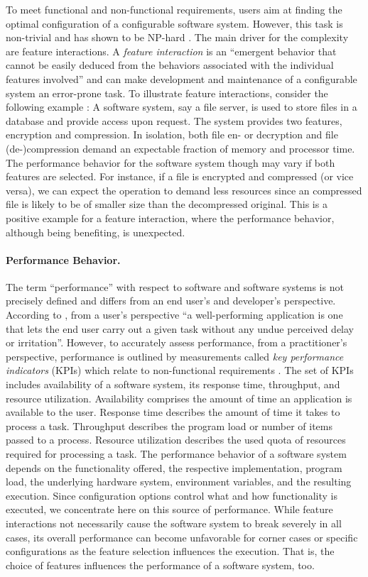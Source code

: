 To meet functional and non-functional requirements, users aim at finding the
optimal configuration of a configurable software system. However, this task is
non-trivial and has shown to be NP-hard \citep{white_selecting_2009}. The main
driver for the complexity are feature interactions. A \emph{feature
interaction} is an ``emergent behavior that cannot be easily deduced from the
behaviors associated with the individual features involved''
\citep{apel_feature-oriented_2013} and can make development and maintenance of
a configurable system an error-prone task.
To illustrate feature interactions, consider the following example
\citep{siegmund_performance-influence_2015}: A software system, say a file
server, is used to store files in a database and provide access upon request.
The system provides two features, encryption and compression. In
isolation, both file en- or decryption and file (de-)compression demand an
expectable fraction of memory and processor time. The performance behavior for
the software system though may vary if both features are selected. For
instance, if a file is encrypted and compressed (or vice versa), we can expect
the operation to demand less resources since an compressed file is likely to be
of smaller size than the decompressed original.
This is a positive example for a feature interaction, where the performance
behavior, although being benefiting, is unexpected.

\paragraph{Performance Behavior.}
The term ``performance'' with respect to software and software systems is not
precisely defined and differs from an end user's and developer’s perspective.
According to \cite{molyneaux_art_2014}, from a user’s perspective ``a well-performing
application is one that lets the end user carry out a given task without any
undue perceived delay or irritation''. However, to accurately assess
performance, from a practitioner’s perspective, performance is outlined by
measurements called \emph{key performance indicators} (KPIs) which relate to
non-functional requirements \citep{molyneaux_art_2014}. The set of KPIs includes
availability of a software system, its response time, throughput, and resource
utilization. Availability comprises the amount of time an application is
available to the user. Response time describes the amount of time it takes to
process a task. Throughput describes the program load or number of items passed
to a process. Resource utilization describes the used quota of resources
required for processing a task.
The performance behavior of a software system depends on the functionality
offered, the respective implementation, program load, the underlying hardware system,
environment variables, and the resulting execution. Since configuration options
control what and how functionality is executed, we concentrate here on this
source of performance. While feature interactions not necessarily cause the
software system to break severely in all cases, its overall performance can
become unfavorable for corner cases or specific configurations as the feature
selection influences the execution. 
That is, the choice of features influences the performance of a software system,
too.

